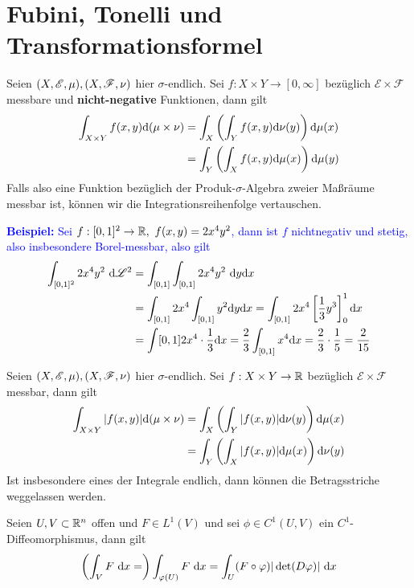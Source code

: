 \documentclass{scrartcl}
\begin{document}
    \section{Fubini, Tonelli und Transformationsformel}
    \begin{lemma}[Tonelli] Seien $(X,\mathscr{E},\mu), (X,\mathscr{F},\nu)$ hier $\sigma$-endlich. Sei \(f:X\times Y \to [0,\infty]\) bezüglich $\mathscr{E}\times\mathscr{F}$ messbare und \textbf{nicht-negative}
        Funktionen, dann gilt
        \begin{align*}
            \int_{X\times Y} f(x,y)  \mathrm{d} (\mu \times \nu) &= \int_X\left( \int_Y f(x,y)  \mathrm{d} \nu(y)\right) \mathrm{d} \mu(x) \\ &= \int_Y\left( \int_X f(x,y)  \mathrm{d} \mu(x)\right) \mathrm{d} \mu(y)
        \end{align*}
        Falls also eine Funktion bezüglich der Produk-$\sigma$-Algebra zweier Maßräume messbar ist, können wir die Integrationsreihenfolge vertauschen.
    \end{lemma}
    \textcolor{blue}{\textbf{Beispiel:} Sei $f:[0,1]^2\to \mathbb{R}, \ f(x,y)=2x^4y^2$, dann ist $f$ nichtnegativ und stetig, also insbesondere Borel-messbar, also gilt 
    \begin{align*}
        \int_{[0,1]^2} 2x^4 y^2 \ \mathrm{d} \mathscr{L}^2 &= \int_{[0,1]}\int_{[0,1]} 2x^4 y^2 \ \mathrm{d} y \mathrm{d} x \\
        & = \int_{[0,1]} 2x^4 \int_{[0,1]} y^2 \mathrm{d} y\mathrm{d} x = \int_{[0,1]} 2x^4 \left[\frac{1}{3}y^3\right]_0^1 \mathrm{d} x\\
        &= \int[0,1] 2x^4 \cdot \frac{1}{3} \mathrm{d} x = \frac{2}{3}\int_{[0,1]} x^4 \mathrm{d} x = \frac{2}{3}\cdot \frac{1}{5} = \frac{2}{15}
    \end{align*} }
    \begin{satz}[Fubini] 
        Seien $(X,\mathscr{E},\mu), (X,\mathscr{F},\nu)$ hier $\sigma$-endlich. Sei \(f:X\times Y \to \mathbb{R}\) bezüglich $\mathscr{E}\times\mathscr{F}$ messbar, dann gilt
        \begin{align*}
            \int_{X\times Y} \vert f(x,y)\vert \mathrm{d} (\mu \times \nu) &= \int_X \left(\int_Y \vert f(x,y)\vert \mathrm{d} \nu(y)\right)\mathrm{d} \mu(x) \\ 
             &= \int_Y \left(\int_X \vert f(x,y) \vert \mathrm{d} \mu(x) \right)\mathrm{d} \nu(y) 
        \end{align*}
        Ist insbesondere eines der Integrale endlich, dann können die Betragsstriche weggelassen werden.
    \end{satz}
    \begin{satz}[Transformationsformel] Seien $U,V\subset \mathbb{R}^n$ offen und $F\in L^1(V)$ und sei $\phi\in C^1(U,V)$ ein $C^1$-Diffeomorphismus, dann gilt
        \[
        \left(\int_V F \ \mathrm{d} x =\right)\int_{\varphi(U)} F \ \mathrm{d} x = \int_U (F\circ \varphi) \vert \det (D\varphi)\vert \ \mathrm{d} x    
        \]
        
    \end{satz}
\end{document}
